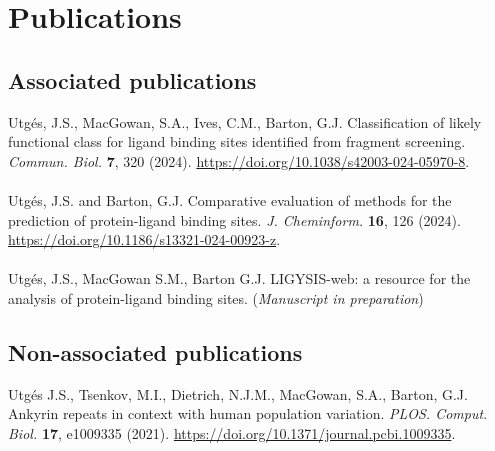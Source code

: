 \chapter*{Publications}

\section*{Associated publications}

Utgés, J.S., MacGowan, S.A., Ives, C.M., Barton, G.J. Classification of likely functional class for ligand binding sites identified from fragment screening. \textit{Commun. Biol.} \textbf{7}, 320 (2024). \url{https://doi.org/10.1038/s42003-024-05970-8}.
\\\\ 
\noindent
Utgés, J.S. and Barton, G.J. Comparative evaluation of methods for the prediction of protein-ligand binding sites. \textit{J. Cheminform.} \textbf{16}, 126 (2024). \url{https://doi.org/10.1186/s13321-024-00923-z}.
\\\\ 
\noindent
Utgés, J.S., MacGowan S.M., Barton G.J. LIGYSIS-web: a resource for the analysis of protein-ligand binding sites. (\textit{Manuscript in preparation})

\section*{Non-associated publications}

Utgés J.S., Tsenkov, M.I., Dietrich, N.J.M., MacGowan, S.A., Barton, G.J. Ankyrin repeats in context with human population variation. \textit{PLOS. Comput. Biol.} \textbf{17}, e1009335 (2021). \url{https://doi.org/10.1371/journal.pcbi.1009335}.